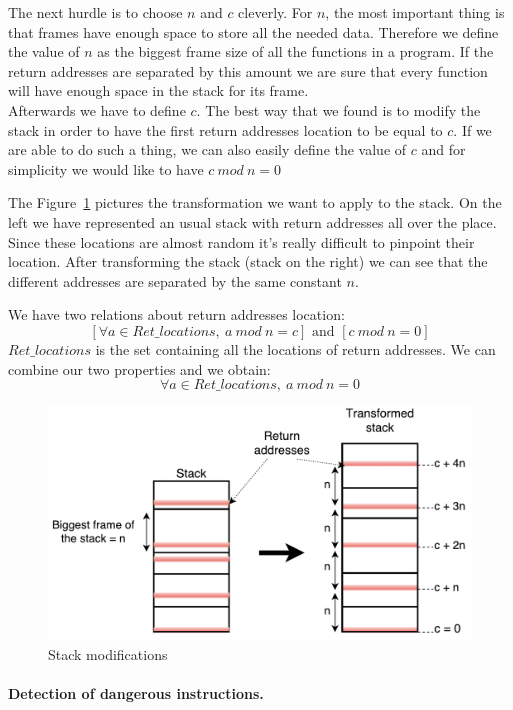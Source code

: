 \documentclass[11pt]{sdm}
\begin{document}
The next hurdle is to choose $n$ and $c$ cleverly. 
For $n$, the most important thing is that frames have enough space to store all the needed data. Therefore we define the value of $n$ as the biggest frame size of all the functions in a program.
If the return addresses are separated by this amount we are sure that every function will have enough space in the stack for its frame. \\
Afterwards we have to define $c$. The best way that we found is to modify the stack in order to have the first return addresses location to be equal to $c$. If we are able to do such a thing, we can also easily define the value of $c$ and for simplicity we would like to have $c~mod~n = 0$

The Figure~\ref{idea_stack} pictures the transformation we want to apply to the stack. On the left we have represented an usual stack with return addresses all over the place.
Since these locations are almost random it's really difficult to pinpoint their location. After transforming the stack (stack on the right) we can see that the different addresses are separated by the same constant $n$.

We have two relations about return addresses location:
$$[\forall a\in Ret\_locations,~a~mod~n=c]\text{ and }[c~mod~n=0]$$
$Ret\_locations$ is the set containing all the locations of return addresses.
We can combine our two properties and we obtain:
{\Large $$\forall a\in Ret\_locations,~a~mod~n=0$$}

\begin{figure}[!ht]
\centering
\includegraphics[scale=0.6]{images/idea_stack.pdf}
\caption{Stack modifications}
\label{idea_stack}
\end{figure}

\paragraph{Detection of dangerous instructions.}
\label{par:Detection of dangerous instructions}
\end{document}
